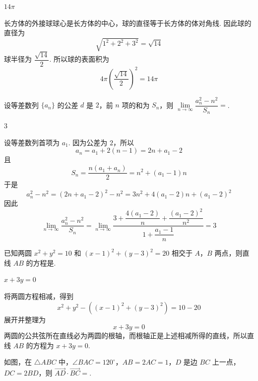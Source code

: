 \begin{answer}
\(14\pi\)
\end{answer}

\begin{solution}
长方体的外接球球心是长方体的中心，球的直径等于长方体的体对角线. 因此球的直径为
\[
\sqrt{1^2+2^2+3^2}=\sqrt{14}
\]
球半径为 \(\dfrac{\sqrt{14}}2\). 所以球的表面积为
\[
4\pi\left(\frac{\sqrt{14}}2\right)^2=14\pi
\]
\end{solution}

\begin{problem}
设等差数列 \(\{a_{n}\}\) 的公差 \(d\) 是 \(2\)，前 \(n\) 项的和为 \(S_{n}\)，则 \(\lim\limits_{n\to \infty}\dfrac{a_n^2 - n^2}{S_n} =\)\fillinblank{}.
\end{problem}

\begin{answer}
\(3\)
\end{answer}

\begin{solution}
设等差数列首项为 \(a_1\). 因为公差为 \(2\)，所以
\[
a_n=a_1+2(n-1)=2n+a_1-2
\]
且
\[
S_n=\frac{n(a_1+a_n)}2=n^2+(a_1-1)n
\]
于是
\[
a_n^2-n^2=\left(2n+a_1-2\right)^2-n^2
=3n^2+4(a_1-2)n+(a_1-2)^2
\]
因此
\[
\lim_{n\to\infty}\frac{a_n^2-n^2}{S_n}
=\lim_{n\to\infty}\frac{3+\dfrac{4(a_1-2)}n+\dfrac{(a_1-2)^2}{n^2}}{1+\dfrac{a_1-1}{n}}=3
\]
\end{solution}

\begin{problem}
已知两圆 \(x^{2} + y^{2} = 10\) 和 \((x - 1)^{2} + (y - 3)^{2} = 20\) 相交于 \(A\)，\(B\) 两点，则直线 \(AB\) 的方程是\fillinblank{}.
\end{problem}

\begin{answer}
\(x + 3y = 0\)
\end{answer}

\begin{solution}
将两圆方程相减，得到
\[
x^2+y^2-\left((x-1)^2+(y-3)^2\right)=10-20
\]
展开并整理为
\[
x+3y=0
\]
两圆的公共弦所在直线必为两圆的根轴，而根轴正是上述相减所得的直线，所以直线 \(AB\) 的方程为 \(x+3y=0\).
\end{solution}

\begin{problem}
如图，在 \(\triangle ABC\) 中，\(\angle BAC = 120^{\circ}\)，\(AB = 2AC = 1\)，\(D\) 是边 \(BC\) 上一点，\(DC = 2BD\)，则 \(\overrightarrow{AD} \cdot \overrightarrow{BC} =\)\fillinblank{}.

\end{problem}

